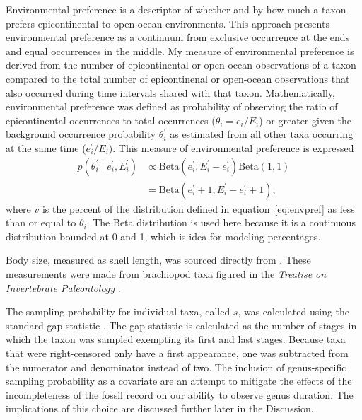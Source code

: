 \documentclass[11pt]{article}
\begin{document}
Environmental preference is a descriptor of whether and by how much a taxon prefers epicontinental to open-ocean environments. This approach presents environmental preference as a continuum from exclusive occurrence at the ends and equal occurrences in the middle. My measure of environmental preference is derived from the number of epicontinental or open-ocean observations of a taxon compared to the total number of epicontinenal or open-ocean observations that also occurred during time intervals shared with that taxon. Mathematically, environmental preference was defined as probability of observing the ratio of epicontinental occurrences to total occurrences (\(\theta_{i} = e_{i} / E_{i}\)) or greater given the background occurrence probability \(\theta^{\prime}_{i}\) as estimated from all other taxa occurring at the same time (\(e^{\prime}_{i} / E^{\prime}_{i}\)). This measure of environmental preference is expressed
\begin{equation}
  \begin{aligned}
    p\left(\theta^{\prime}_{i} \middle| e^{\prime}_{i}, E^{\prime}_{i} \right) &\propto \mathrm{Beta}(e^{\prime}_{i}, E^{\prime}_{i} - e^{\prime}_{i}) \mathrm{Beta}(1, 1) \\
    &= \mathrm{Beta}(e^{\prime}_{i} + 1, E^{\prime}_{i} - e^{\prime}_{i} + 1),
  \end{aligned}
  \label{eq:envpref}
\end{equation}
where \(v\) is the percent of the distribution defined in equation~\ref{eq:envpref} as less than or equal to \(\theta_{i}\). The Beta distribution is used here because it is a continuous distribution bounded at 0 and 1, which is idea for modeling percentages.

Body size, measured as shell length, was sourced directly from \citet{Payne2014}. These measurements were made from brachiopod taxa figured in the \textit{Treatise on Invertebrate Paleontology} \citep{Brunton2007}.

The sampling probability for individual taxa, called \(s\), was calculated using the standard gap statistic \citep{Foote1996e,Foote2000}. The gap statistic is calculated as the number of stages in which the taxon was sampled exempting its first and last stages. Because taxa that were right-censored only have a first appearance, one was subtracted from the numerator and denominator instead of two. The inclusion of genus-specific sampling probability as a covariate are an attempt to mitigate the effects of the incompleteness of the fossil record on our ability to observe genus duration. The implications of this choice are discussed further later in the Discussion.
\end{document}
